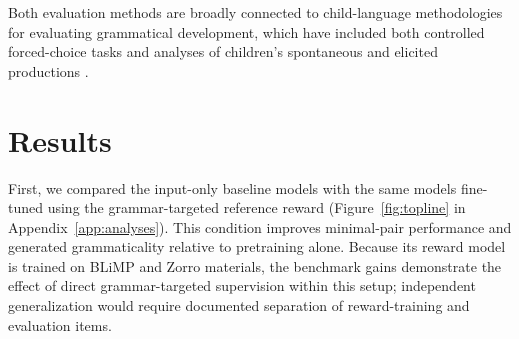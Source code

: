 Both evaluation methods are broadly connected to child-language methodologies for evaluating grammatical development, which have included both controlled forced-choice tasks and analyses of children’s spontaneous and elicited productions \cite{ambridge2011child}.





\section{Results}
\label{sec:results}

First, we compared the input-only baseline models with the same models fine-tuned using the grammar-targeted reference reward (Figure~\ref{fig:topline} in Appendix~\ref{app:analyses}). This condition improves minimal-pair performance and generated grammaticality relative to pretraining alone. Because its reward model is trained on BLiMP and Zorro materials, the benchmark gains demonstrate the effect of direct grammar-targeted supervision within this setup; independent generalization would require documented separation of reward-training and evaluation items.

